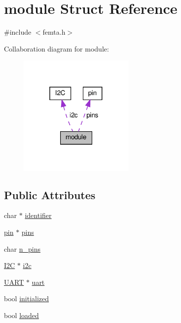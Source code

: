\hypertarget{structmodule}{}\section{module Struct Reference}
\label{structmodule}


{\ttfamily \#include $<$femta.\+h$>$}



Collaboration diagram for module\+:
\nopagebreak
\begin{figure}[H]
\begin{center}
\leavevmode
\includegraphics[width=160pt]{structmodule__coll__graph}
\end{center}
\end{figure}
\subsection*{Public Attributes}
\begin{DoxyCompactItemize}
\item 
char $\ast$ \hyperlink{structmodule_ab82c1bea579b33b2855bd99cc6277c8a}{identifier}
\item 
\hyperlink{structpin}{pin} $\ast$ \hyperlink{structmodule_a3a758f16bbf56b5df5bfb1cfd7515fdb}{pins}
\item 
char \hyperlink{structmodule_a02c9f82d64608b57e23ec9b6d8e40442}{n\+\_\+pins}
\item 
\hyperlink{structI2C}{I2C} $\ast$ \hyperlink{structmodule_aedc78b570290808d3e47d2bb2dadd155}{i2c}
\item 
\hyperlink{femta_8h_a13b3221f36ef9cb93c995303f10fed50}{U\+A\+RT} $\ast$ \hyperlink{structmodule_af74c4f29b898b255838d6b18731fa565}{uart}
\item 
bool \hyperlink{structmodule_a9b7ebb7008b8bc642090447151895cae}{initialized}
\item 
bool \hyperlink{structmodule_a321b33f91b9b132f34d66fef4243e201}{loaded}
\end{DoxyCompactItemize}


